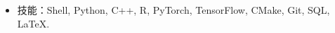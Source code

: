   \begin{itemize}[leftmargin=*]



    \item 技能：Shell, Python, C++, R, PyTorch, TensorFlow, CMake, Git, SQL, \LaTeX.
  \end{itemize}

